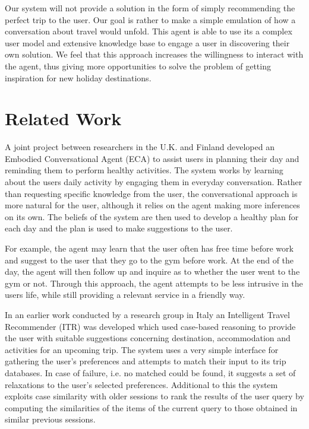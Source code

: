 \documentclass[11pt]{article} %
\begin{document}
Our system will not provide a solution in the form of simply recommending the perfect trip to the user. Our goal is rather to make a simple emulation of how a conversation about travel would unfold. This agent is able to use its a complex user model and extensive
knowledge base to engage a user in discovering their own solution.
We feel that this approach increases the willingness to interact
with the agent, thus giving more opportunities to solve the problem of getting inspiration for new holiday destinations.

\section{Related Work}
A joint project between researchers in the U.K. and Finland \cite{cavazza08}
developed an Embodied Conversational Agent (ECA) to assist
users in planning their day and reminding them to perform
healthy activities. The system works by learning about the
users daily activity by engaging them in everyday conversation.
Rather than requesting specific knowledge from the user, the
conversational approach is more natural for the user, although
it relies on the agent making more inferences on its own. The
beliefs of the system are then used to develop a healthy plan
for each day and the plan is used to make suggestions to the user.

For example, the agent may learn that the user often has free
time before work and suggest to the user that they go to the
gym before work. At the end of the day, the agent will then
follow up and inquire as to whether the user went to the gym
or not. Through this approach, the agent attempts to be less
intrusive in the users life, while still providing a relevant
service in a friendly way.

In an earlier work conducted by a research group in Italy \cite{ricci02} an
Intelligent Travel Recommender (ITR) was developed which used
case-based reasoning to provide the user with suitable
suggestions concerning destination, accommodation and
activities for an upcoming trip. The system uses a very
simple interface for gathering the user's preferences and
attempts to match their input to its trip databases. In case
of failure, i.e. no matched could be found, it suggests a set
of relaxations to the user's selected preferences. Additional
to this the system exploits case similarity with older sessions
to rank the results of the user query by computing the
similarities of the items of the current query to those
obtained in similar previous sessions.
\end{document}
